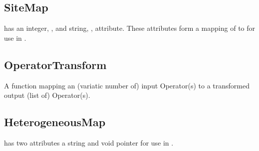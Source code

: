 

\subsection{\textbf{SiteMap}}\label{subsec:Sitemap}
 has an integer, , and string, , attribute. These attributes form a mapping of  to  for use in \Clang.

\subsection{\textbf{OperatorTransform}}\label{subsec:OperatorTransform}
 A function mapping an (variatic number of) input Operator(s) to a transformed output (list of) Operator(s). 

\subsection{\textbf{HeterogeneousMap}}\label{subsec:direction}
 has two attributes a string  and void pointer  for use in \Clang.
